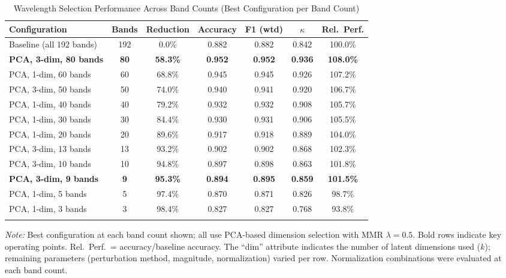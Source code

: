 \begin{table}[!t]
\centering
\caption{Wavelength Selection Performance Across Band Counts (Best Configuration per Band Count)}
\label{tab:main_results}
\begin{tabular}{@{}lcccccc@{}}
\toprule
\textbf{Configuration} & \textbf{Bands} & \textbf{Reduction} & \textbf{Accuracy} & \textbf{F1 (wtd)} & \textbf{$\kappa$} & \textbf{Rel.\ Perf.} \\
\midrule
Baseline (all 192 bands) & 192 & 0.0\% & 0.882 & 0.882 & 0.842 & 100.0\% \\
\midrule
\textbf{PCA, 3-dim, 80 bands} & \textbf{80} & \textbf{58.3\%} & \textbf{0.952} & \textbf{0.952} & \textbf{0.936} & \textbf{108.0\%} \\
PCA, 1-dim, 60 bands & 60 & 68.8\% & 0.945 & 0.945 & 0.926 & 107.2\% \\
PCA, 3-dim, 50 bands & 50 & 74.0\% & 0.940 & 0.941 & 0.920 & 106.7\% \\
PCA, 1-dim, 40 bands & 40 & 79.2\% & 0.932 & 0.932 & 0.908 & 105.7\% \\
PCA, 1-dim, 30 bands & 30 & 84.4\% & 0.930 & 0.931 & 0.906 & 105.5\% \\
PCA, 1-dim, 20 bands & 20 & 89.6\% & 0.917 & 0.918 & 0.889 & 104.0\% \\
PCA, 3-dim, 13 bands & 13 & 93.2\% & 0.902 & 0.902 & 0.868 & 102.3\% \\
PCA, 3-dim, 10 bands & 10 & 94.8\% & 0.897 & 0.898 & 0.863 & 101.8\% \\
\textbf{PCA, 3-dim, 9 bands} & \textbf{9} & \textbf{95.3\%} & \textbf{0.894} & \textbf{0.895} & \textbf{0.859} & \textbf{101.5\%} \\
PCA, 1-dim, 5 bands & 5 & 97.4\% & 0.870 & 0.871 & 0.826 & 98.7\% \\
PCA, 1-dim, 3 bands & 3 & 98.4\% & 0.827 & 0.827 & 0.768 & 93.8\% \\
\bottomrule
\vspace{0.2em}
\end{tabular}
\parbox{\textwidth}{\small\textit{Note:} Best configuration at each band count shown; all use PCA-based dimension selection with MMR $\lambda = 0.5$. Bold rows indicate key operating points. Rel.\ Perf.\ = accuracy/baseline accuracy. The ``dim'' attribute indicates the number of latent dimensions used ($k$); remaining parameters (perturbation method, magnitude, normalization) varied per row. Normalization combinations were evaluated at each band count.}
\end{table}

